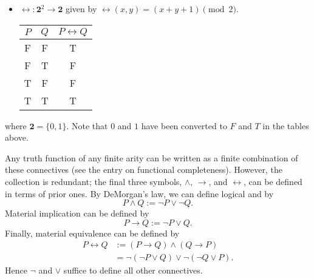 \documentclass[12pt]{article}
\begin{document}
\begin{itemize}
\item
$\leftrightarrow: \boldsymbol{2}^2 \to \boldsymbol{2}$ given by $\leftrightarrow(x,y)=(x+y+1) \pmod 2$.

\begin{center}
\begin{tabular}{ccc}
$P$ & $Q$ & $P \leftrightarrow Q$ \\
\hline
F & F & T \\
F & T & F \\
T & F & F \\
T & T & T
\end{tabular}
\end{center}

\end{itemize}

where $\boldsymbol{2}=\lbrace 0,1\rbrace$.  Note that $0$ and $1$ have been converted to $F$ and $T$ in the tables above.

Any truth function of any finite arity can be written as a finite combination of these connectives (see the entry on functional completeness).  However, the collection is redundant; the final three symbols, $\land$, $\rightarrow$, and $\leftrightarrow$, can be defined in terms of prior ones.  By DeMorgan's law, we can define logical and by
\[
P\land Q := \lnot P\lor \lnot Q.
\]
Material implication can be defined by
\[
P\rightarrow Q := \lnot P\lor Q.
\]
Finally, material equivalence can be defined by
\begin{align*}
P\leftrightarrow Q 
&:= (P\rightarrow Q)\land(Q\rightarrow P) \\
&= \lnot(\lnot P\lor Q)\lor\lnot(\lnot Q\lor P).
\end{align*}
Hence $\lnot$ and $\vee$ suffice to define all other connectives.
\end{document}
